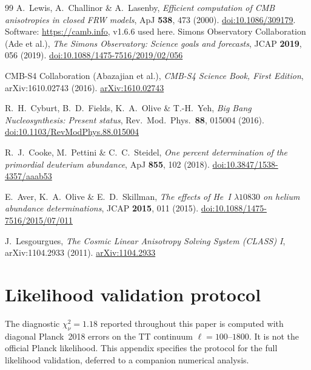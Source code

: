 \documentclass[twocolumn,10pt]{article}
\begin{document}
\begin{thebibliography}{99}
A.~Lewis, A.~Challinor \& A.~Lasenby,
  \textit{Efficient computation of CMB anisotropies in closed FRW models},
  ApJ \textbf{538}, 473 (2000).
  \href{https://doi.org/10.1086/309179}{doi:10.1086/309179}.
  Software: \href{https://camb.info}{https://camb.info}, v1.6.6 used here.
Simons Observatory Collaboration (Ade et al.),
  \textit{The Simons Observatory: Science goals and forecasts},
  JCAP \textbf{2019}, 056 (2019).
  \href{https://doi.org/10.1088/1475-7516/2019/02/056}{doi:10.1088/1475-7516/2019/02/056}

CMB-S4 Collaboration (Abazajian et al.),
  \textit{CMB-S4 Science Book, First Edition},
  arXiv:1610.02743 (2016).
  \href{https://arxiv.org/abs/1610.02743}{arXiv:1610.02743}

R.~H.~Cyburt, B.~D.~Fields, K.~A.~Olive \& T.-H.~Yeh,
  \textit{Big Bang Nucleosynthesis: Present status},
  Rev.\ Mod.\ Phys.\ \textbf{88}, 015004 (2016).
  \href{https://doi.org/10.1103/RevModPhys.88.015004}{doi:10.1103/RevModPhys.88.015004}

R.~J.~Cooke, M.~Pettini \& C.~C.~Steidel,
  \textit{One percent determination of the primordial deuterium abundance},
  ApJ \textbf{855}, 102 (2018).
  \href{https://doi.org/10.3847/1538-4357/aaab53}{doi:10.3847/1538-4357/aaab53}

E.~Aver, K.~A.~Olive \& E.~D.~Skillman,
  \textit{The effects of He~I $\lambda10830$ on helium abundance determinations},
  JCAP \textbf{2015}, 011 (2015).
  \href{https://doi.org/10.1088/1475-7516/2015/07/011}{doi:10.1088/1475-7516/2015/07/011}

J.~Lesgourgues,
  \textit{The Cosmic Linear Anisotropy Solving System (CLASS) I},
  arXiv:1104.2933 (2011).
  \href{https://arxiv.org/abs/1104.2933}{arXiv:1104.2933}

\end{thebibliography}

\appendix

\section{Likelihood validation protocol}
\label{app:likelihood}

The diagnostic $\chi^2_\nu=1.18$ reported throughout this paper
is computed with diagonal Planck~2018 errors on the TT continuum
$\ell=100$--$1800$. It is not the official Planck likelihood.
This appendix specifies the protocol for the full likelihood
validation, deferred to a companion numerical analysis.
\end{document}

